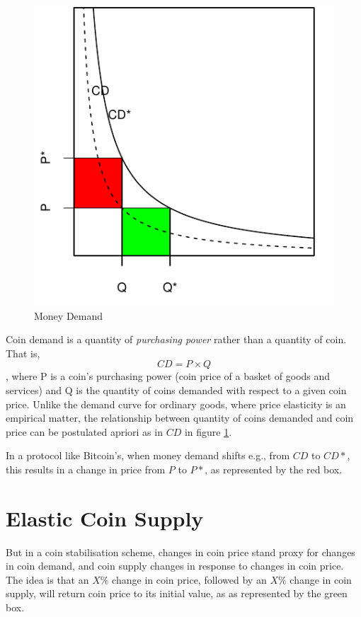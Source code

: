 \documentclass[twocolumn]{article}
\begin{document}
\begin{figure}
  \begin{center}
    \includegraphics{chart1.pdf}
  \end{center}
  \caption{Money Demand}
  \label{fig:money-demand}
\end{figure}

Coin demand is a quantity of \emph{purchasing power} rather than a
quantity of coin. That is,
\begin{equation}\label{eqn:coin-demand}
CD = P\times Q
\end{equation}
, where P is a coin's purchasing power (coin price of a basket of
goods and services) and Q is the quantity of coins demanded with
respect to a given coin price. Unlike the demand curve for ordinary
goods, where price elasticity is an empirical matter, the relationship
between quantity of coins demanded and coin price can be postulated
apriori as in $CD$ in figure \ref{fig:money-demand}. 

In a protocol like Bitcoin's, when money demand shifts e.g., from $CD$
to $CD*$, this results in a change in price from $P$ to $P*$, as
represented by the red box.

\section*{Elastic Coin Supply}
But in a coin stabilisation scheme, changes in coin price stand proxy
for changes in coin demand, and coin supply changes in response to
changes in coin price. The idea is that an $X\%$ change in coin price,
followed by an $X\%$ change in coin supply, will return coin price to
its initial value, as as represented by the green box.
\end{document}
